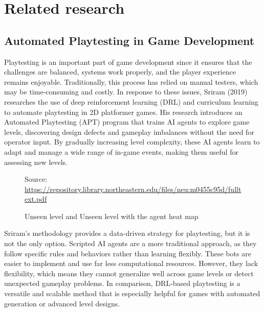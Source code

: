 \documentclass[12pt,oneside,openright,a4paper]{cpe-english-project}
\begin{document}
\section{Related research}

\subsection{Automated Playtesting in Game Development}
Playtesting is an important part of game development since it ensures that the challenges are balanced, systems work properly, and the player experience remains enjoyable. Traditionally, this process has relied on manual testers, which may be time-consuming and costly. In response to these issues, Sriram (2019) researches the use of deep reinforcement learning (DRL) and curriculum learning to automate playtesting in 2D platformer games. His research introduces an Automated Playtesting (APT) program that trains AI agents to explore game levels, discovering design defects and gameplay imbalances without the need for operator input. By gradually increasing level complexity, these AI agents learn to adapt and manage a wide range of in-game events, making them useful for assessing new levels.\par
\begin{figure}[!h]
\centering
{}
\caption{Unseen level and Unseen level with the agent heat map}\label{fig:UnseenLevel}
Source:
\href{https://repository.library.northeastern.edu/files/neu:m0455c95d/fulltext.pdf}{https://repository.library.northeastern.edu/files/neu:m0455c95d/fulltext.pdf} 
\end{figure}
Sriram's methodology provides a data-driven strategy for playtesting, but it is not the only option. Scripted AI agents are a more traditional approach, as they follow specific rules and behaviors rather than learning flexibly. These bots are easier to implement and use far less computational resources. However, they lack flexibility, which means they cannot generalize well across game levels or detect unexpected gameplay problems. In comparison, DRL-based playtesting is a versatile and scalable method that is especially helpful for games with automated generation or advanced level designs.\par
\newpage
\end{document}
